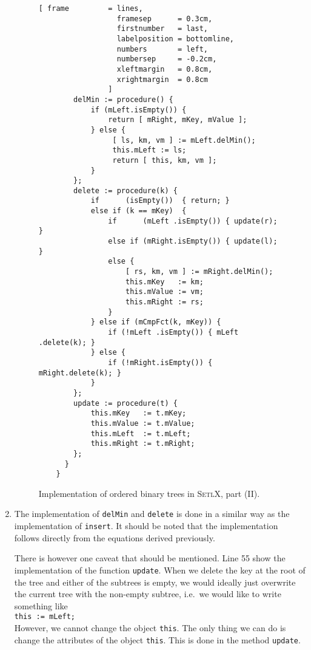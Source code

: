 \begin{enumerate}
\begin{figure}[!ht]
  \centering
\begin{Verbatim}[ frame         = lines, 
                  framesep      = 0.3cm, 
                  firstnumber   = last,
                  labelposition = bottomline,
                  numbers       = left,
                  numbersep     = -0.2cm,
                  xleftmargin   = 0.8cm,
                  xrightmargin  = 0.8cm
                ]
        delMin := procedure() {
            if (mLeft.isEmpty()) { 
                return [ mRight, mKey, mValue ]; 
            } else {
                 [ ls, km, vm ] := mLeft.delMin();
                 this.mLeft := ls;
                 return [ this, km, vm ];
            }
        };
        delete := procedure(k) {
            if      (isEmpty())  { return; } 
            else if (k == mKey)  {
                if      (mLeft .isEmpty()) { update(r); }  
                else if (mRight.isEmpty()) { update(l); } 
                else {
                    [ rs, km, vm ] := mRight.delMin();
                    this.mKey   := km;
                    this.mValue := vm; 
                    this.mRight := rs;
                }
            } else if (mCmpFct(k, mKey)) {
                if (!mLeft .isEmpty()) { mLeft .delete(k); }
            } else {
                if (!mRight.isEmpty()) { mRight.delete(k); }
            }
        };
        update := procedure(t) {
            this.mKey   := t.mKey;
            this.mValue := t.mValue;
            this.mLeft  := t.mLeft;
            this.mRight := t.mRight;
        };
      }
    }
\end{Verbatim}
\vspace*{-0.3cm}
  \caption{Implementation of ordered binary trees in \textsc{SetlX}, part (II).}
  \label{fig:binary-tree.stlx-2}
\end{figure}

\item The implementation of \texttt{delMin} and \texttt{delete} is done in a similar way as the
      implementation of \texttt{insert}.  It should be noted that the implementation follows directly from the
      equations derived  previously. 
      
      There is however one caveat that should be mentioned.  Line 55 show the implementation of the
      function \texttt{update}.  When we delete the key at the root of the tree and either of the
      subtrees is empty, we would ideally just overwrite the current tree with the non-empty
      subtree, i.e.~we would like to write something like
      \\[0.2cm]
      \hspace*{1.3cm}
      \texttt{this := mLeft;}
      \\[0.2cm]
      However, we cannot change the object \texttt{this}.  The only thing we can do is change the
      attributes of the object \texttt{this}.  This is done in the method \texttt{update}.
\end{enumerate}


